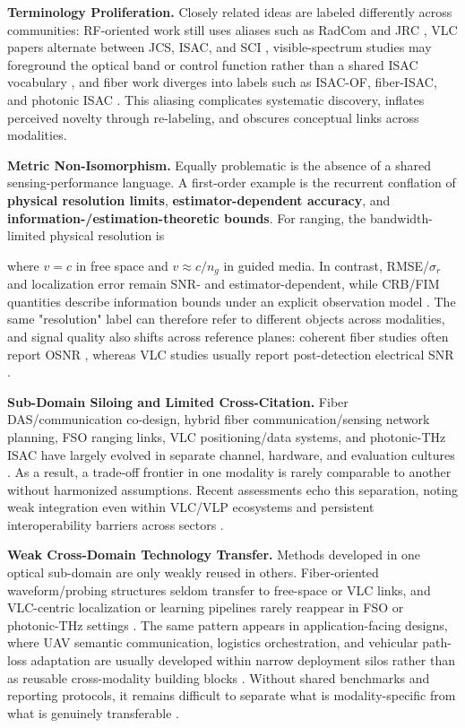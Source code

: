 \documentclass[letterpaper,journal]{IEEEtran}
\begin{document}
\textbf{Terminology Proliferation.} Closely related ideas are labeled differently across communities: RF-oriented work still uses aliases such as RadCom and JRC , VLC papers alternate between JCS, ISAC, and SCI , visible-spectrum studies may foreground the optical band or control function rather than a shared ISAC vocabulary , and fiber work diverges into labels such as ISAC-OF, fiber-ISAC, and photonic ISAC . This aliasing complicates systematic discovery, inflates perceived novelty through re-labeling, and obscures conceptual links across modalities.

\textbf{Metric Non-Isomorphism.} Equally problematic is the absence of a shared sensing-performance language. A first-order example is the recurrent conflation of \textbf{physical resolution limits}, \textbf{estimator-dependent accuracy}, and \textbf{information-/estimation-theoretic bounds}. For ranging, the bandwidth-limited physical resolution is

where $v=c$ in free space and $v\approx c/n_g$ in guided media. In contrast, RMSE/$\sigma_r$ and localization error remain SNR- and estimator-dependent, while CRB/FIM quantities describe information bounds under an explicit observation model . The same "resolution" label can therefore refer to different objects across modalities, and signal quality also shifts across reference planes: coherent fiber studies often report OSNR , whereas VLC studies usually report post-detection electrical SNR .

\textbf{Sub-Domain Siloing and Limited Cross-Citation.} Fiber DAS/communication co-design, hybrid fiber communication/sensing network planning, FSO ranging links, VLC positioning/data systems, and photonic-THz ISAC have largely evolved in separate channel, hardware, and evaluation cultures . As a result, a trade-off frontier in one modality is rarely comparable to another without harmonized assumptions. Recent assessments echo this separation, noting weak integration even within VLC/VLP ecosystems and persistent interoperability barriers across sectors .

\textbf{Weak Cross-Domain Technology Transfer.} Methods developed in one optical sub-domain are only weakly reused in others. Fiber-oriented waveform/probing structures seldom transfer to free-space or VLC links, and VLC-centric localization or learning pipelines rarely reappear in FSO or photonic-THz settings . The same pattern appears in application-facing designs, where UAV semantic communication, logistics orchestration, and vehicular path-loss adaptation are usually developed within narrow deployment silos rather than as reusable cross-modality building blocks . Without shared benchmarks and reporting protocols, it remains difficult to separate what is modality-specific from what is genuinely transferable .
\end{document}
